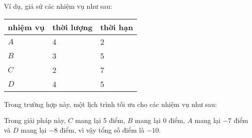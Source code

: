 Ví dụ, giả sử các nhiệm vụ như sau:
\begin{center}
\begin{tabular}{lll}
nhiệm vụ & thời lượng & thời hạn \\
\hline
$A$ & 4 & 2 \\
$B$ & 3 & 5 \\
$C$ & 2 & 7 \\
$D$ & 4 & 5 \\
\end{tabular}
\end{center}
Trong trường hợp này, một lịch trình tối ưu cho các nhiệm vụ
như sau:
\begin{center}
\end{center}
Trong giải pháp này, $C$ mang lại 5 điểm,
$B$ mang lại 0 điểm, $A$ mang lại $-7$ điểm
và $D$ mang lại $-8$ điểm,
vì vậy tổng số điểm là $-10$.

